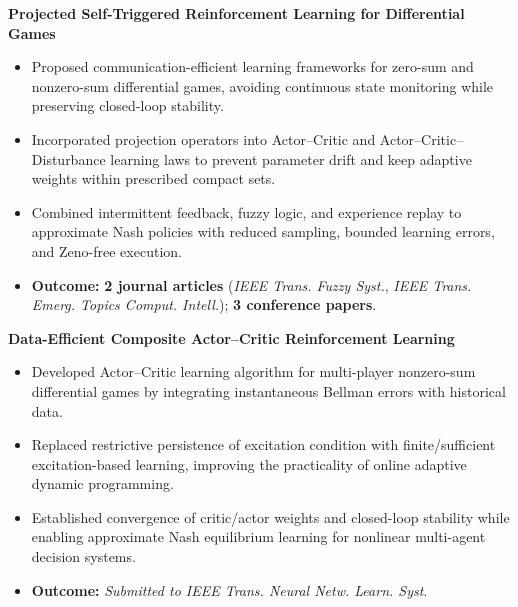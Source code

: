\documentclass[a4paper,11pt]{article}
\newcommand{\externallink}[2]{%
	#2\nobreak\hspace{0.16em}%
	\href{#1}{\textcolor{ExternalArrowColor}{%
			\faIcon{external-link-alt}}}%
}
\begin{document}
\begin{enumerate}[leftmargin=0.2in]
{		\item {\textbf{\externallink{https://feith0306.github.io/about/research/projected-self-triggered-learning/}{Projected Self-Triggered Reinforcement Learning for Differential Games}}}
		\begin{itemize}[leftmargin=0in]
			\item %
			Proposed communication-efficient learning frameworks for zero-sum and nonzero-sum differential games, avoiding continuous state monitoring while preserving closed-loop stability.
			\item %
			Incorporated projection operators into Actor–Critic and Actor–Critic–Disturbance learning laws to prevent parameter drift and keep adaptive weights within prescribed compact sets.
			\item %
			Combined intermittent feedback, fuzzy logic, and experience replay to approximate Nash policies with reduced sampling, bounded learning errors, and Zeno-free execution.
			\item \textbf{Outcome:} \textbf{2 journal articles} (\textit{IEEE Trans. Fuzzy Syst.}, \textit{IEEE Trans. Emerg. Topics Comput. Intell.}); \textbf{3 conference papers}.
		\end{itemize}
		\item {\textbf{\externallink{https://feith0306.github.io/about/research/composite-actor-critic-learning/}{Data-Efficient Composite Actor–Critic Reinforcement Learning}}}
		\begin{itemize}[leftmargin=0in]
			\item %
			Developed Actor–Critic learning algorithm for multi-player nonzero-sum differential games by integrating instantaneous Bellman errors with historical data.
			\item %
			Replaced restrictive persistence of excitation condition with finite/sufficient excitation-based learning, improving the practicality of online adaptive dynamic programming.
			\item %
			Established convergence of critic/actor weights and closed-loop stability while enabling approximate Nash equilibrium learning for nonlinear multi-agent decision systems.
			\item \textbf{Outcome:} \textit{Submitted to IEEE Trans. Neural Netw. Learn. Syst}.
		\end{itemize}
		}
\end{enumerate}
\end{document}
